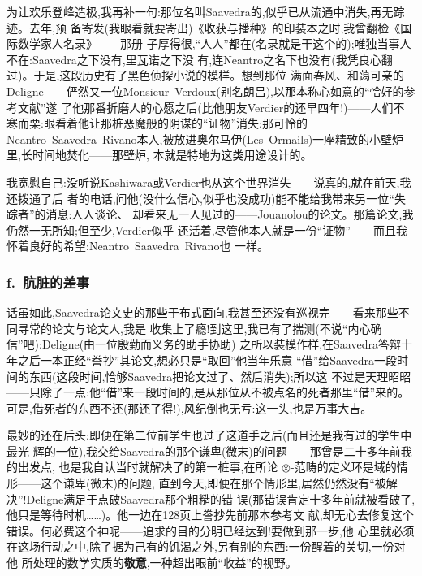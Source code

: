 为让欢乐登峰造极,我再补一句:那位名叫Saavedra的,似乎已从流通中消失,再无踪迹。去年,预
备寄发(我眼看就要寄出)《收获与播种》的印装本之时,我曾翻检《国际数学家人名录》——那册
子厚得很,“人人”都在(名录就是干这个的);唯独当事人不在:Saavedra之下没有,里瓦诺之下没
有,连Neantro之名下也没有(我凭良心翻过)。于是,这段历史有了黑色侦探小说的模样。想到那位
满面春风、和蔼可亲的Deligne——俨然又一位Monsieur~Verdoux(别名朗吕),以那本称心如意的“恰好的参考文献”遂
了他那番折磨人的心愿之后(比他朋友Verdier的还早四年!)——人们不寒而栗:眼看着他让那桩恶魔般的阴谋的“证物”消失:那可怜的Neantro~Saavedra~Rivano本人,被放进奥尔马伊(Les~Ormails)一座精致的小壁炉里,长时间地焚化——那壁炉,
本就是特地为这类用途设计的。

\pmark{}我宽慰自己:没听说Kashiwara或Verdier也从这个世界消失——说真的,就在前天,我还拨通了后
者的电话,问他(没什么信心,似乎也没成功)能不能给我带来另一位“失踪者”的消息:人人谈论、
却看来无一人见过的——Jouanolou的论文。那篇论文,我仍然一无所知;但至少,Verdier似乎
还活着,尽管他本人就是一份“证物”——而且我怀着良好的希望:Neantro~Saavedra~Rivano也
一样。

\subsubsection{f.\ 肮脏的差事}


话虽如此,Saavedra论文史的那些于布式面向,我甚至还没有巡视完——看来那些不同寻常的论文与论文人,我是
收集上了瘾!到这里,我已有了揣测(不说“内心确信”吧):Deligne(由一位殷勤而义务的助手协助)
之所以装模作样,在Saavedra答辩十年之后一本正经“誊抄”其论文,想必只是“取回”他当年乐意
“借”给Saavedra一段时间的东西(这段时间,恰够Saavedra把论文过了、然后消失);所以这
不过是天理昭昭——只除了一点:他“借”来一段时间的,是从那位从不被点名的死者那里“借”来的。
可是,借死者的东西不还(那还了得!),风纪倒也无亏:这一头,也是万事大吉。

最妙的还在后头:即便在第二位前学生也过了这道手之后(而且还是我有过的学生中最光
辉的一位),我交给Saavedra的那个谦卑(微末)的问题——那曾是二十多年前我的出发点,
也是我自认当时就解决了的第一桩事,在所论 $\otimes$-范畴的定义环是域的情形——这个谦卑(微末)的问题,
直到今天,即便在那个情形里,居然仍然没有“被解决”!Deligne满足于点破Saavedra那个粗糙的错
误(那错误肯定十多年前就被看破了,他只是等待时机……)。他一边在128页上誊抄先前那本参考文
献\dmark{},却无心去修复这个错误。何必费这个神呢——追求的目的分明已经达到!要做到那一步,他
心里就必须在这场行动之中,除了据为己有的饥渴之外,另有别的东西:一份醒着的关切,一份对他
所处理的数学实质的\textbf{敬意},一种超出眼前“收益”的视野。

